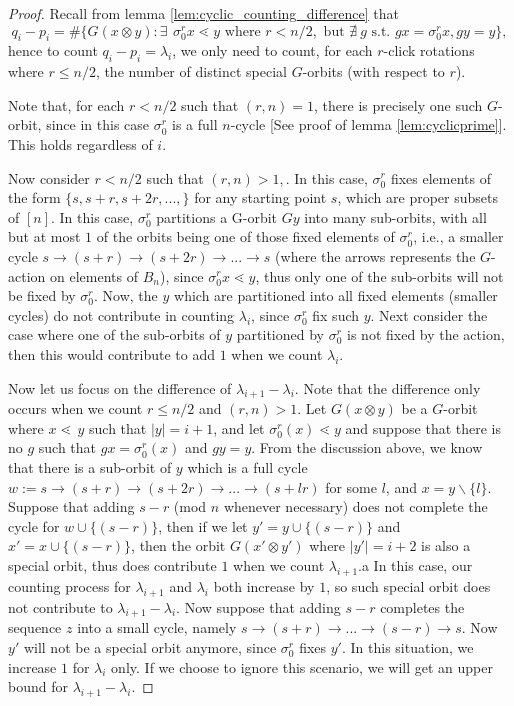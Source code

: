 \documentclass{amsart}
\theoremstyle{remark}
\newcommand{\ra}{\rightarrow}
\newcommand{\minus}{\backslash}
\begin{document}
\begin{proof} 

Recall from lemma \ref{lem:cyclic_counting_difference} that 
 $$q_i - p_i = \#\{G{(x \otimes y)} : \exists \: \, \sigma_0^r x \lessdot y \text{ where } r < n/2, \text{ but } \nexists \:  g \text{ s.t. } g x = \sigma_0 ^r x, g y = y \},$$ 
hence to count $q_i - p_i = \lambda_i $, we only need to count, for each $r$-click rotations where $r \le n/2$, the number of distinct special $G$-orbits (with respect to $r$).

Note that, for each $r < n/2$ such that $(r, n) = 1$, there is precisely one such $G$-orbit, since in this case $\sigma_0^r$ is a full $n$-cycle [See proof of lemma \ref{lem:cyclicprime}]. 
This holds regardless of $i$. 

Now consider $r < n/2$ such that $(r, n) > 1,$. In this case, $\sigma_0^r$ fixes elements of the form $\{s, s+r, s+2r, ..., \}$ for any starting point $s$, which are proper subsets of $[n]$. In this case, $\sigma_0^r$ partitions a G-orbit $Gy$ into many sub-orbits, with all but at most $1$ of the orbits being one of those fixed elements of $\sigma_0^r$, i.e., a smaller cycle $s \ra (s+r) \ra (s+2r) \ra ... \ra s$ (where the arrows represents the $G$-action on elements of $B_n$),  since $\sigma_0^r x \lessdot y$, thus only one of the sub-orbits will not be fixed by $\sigma_0^r.$ Now, the $y$ which are partitioned into all fixed elements (smaller cycles) do not contribute in counting $\lambda_i$, since $\sigma_0^r$ fix such $y$. Next consider the case where one of the sub-orbits of $y$ partitioned by $\sigma_0^r$ is not fixed by the action, then this would contribute to add $1$ when we count $\lambda_i$. 

Now let us focus on the difference of $\lambda_{i+1} - \lambda_{i}$. Note that the difference only occurs when we count $r \le n/2$ and $(r, n) > 1$. Let $G{(x \otimes y)}$ be a $G$-orbit where $x \lessdot \, y$ such that $|y| = i+1$, and let $\sigma_0^{r} (x) \lessdot  y$ and suppose that there is no $g$ such that $g x = \sigma_0 ^r (x)$ and $gy = y$. From the discussion above, we know that there is a sub-orbit of $y$ which is a full cycle $w := s \ra (s+r) \ra (s+2r) \ra ... \ra (s+ lr)$  for some $l $, and $x = y \minus \{l\} $. Suppose that adding $s-r $ (mod $n$ whenever necessary) does not complete the cycle for  $w \cup \{(s - r)\}$, then if we let  $y' = y \cup \{(s - r) \} $ and $x' = x \cup \{(s -r)\}$, then the orbit $G{(x' \otimes y')}$ where $|y'| = i+2$ is also a special orbit, thus does contribute $1$ when we count $\lambda_{i+1}$.a   In this case, our counting process for $\lambda_{i+1}$ and $\lambda_{i}$ both increase by $1$, so such special orbit does not contribute to $\lambda_{i+1} - \lambda_{i}$. Now suppose that adding $s -r$ completes the sequence $z$ into a small cycle, namely $s \ra (s+r) \ra ... \ra (s-r) \ra s$. Now $y'$ will not be a special orbit anymore, since $\sigma_0^r $ fixes $y'$. In this situation,  we increase  $1$ for $\lambda_i$ only. If we choose to ignore this scenario, we will get an upper bound for $\lambda_{i+1} - \lambda_i$. 


\end{proof}
\end{document}
